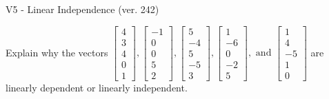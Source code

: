 \begin{exercise}
  \begin{exerciseTitle}V5 - Linear Independence (ver. 242)\end{exerciseTitle}
  \begin{exerciseStatement}
    Explain why the vectors \(\left[\begin{array}{r}
4 \\
3 \\
4 \\
0 \\
1
\end{array}\right] , \left[\begin{array}{r}
-1 \\
0 \\
0 \\
5 \\
2
\end{array}\right] , \left[\begin{array}{r}
5 \\
-4 \\
5 \\
-5 \\
3
\end{array}\right] , \left[\begin{array}{r}
1 \\
-6 \\
0 \\
-2 \\
5
\end{array}\right] , \text{ and } \left[\begin{array}{r}
1 \\
4 \\
-5 \\
1 \\
0
\end{array}\right]\) are linearly dependent or linearly independent.	



\end{exerciseStatement}
\end{exercise}
